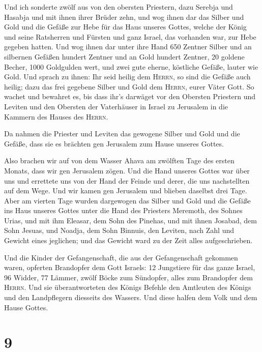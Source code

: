  Und ich sonderte zwölf aus von den obersten Priestern,
dazu Serebja und Hasabja und mit ihnen ihrer Brüder zehn,
 und wog ihnen dar das Silber und Gold und die Gefäße zur
Hebe für das Haus unseres Gottes, welche der König und seine Ratsherren
und Fürsten und ganz Israel, das vorhanden war, zur Hebe gegeben hatten.
 Und wog ihnen dar unter ihre Hand 650 Zentner Silber und
an silbernen Gefäßen hundert Zentner und an Gold hundert Zentner,
 20 goldene Becher, 1000 Goldgulden wert, und zwei gute
eherne, köstliche Gefäße, lauter wie Gold.  Und sprach zu
ihnen: Ihr seid heilig dem \textsc{Herrn}, so sind die Gefäße auch
heilig; dazu das frei gegebene Silber und Gold dem \textsc{Herrn}, eurer
Väter Gott.  So wachet und bewahret es, bis dass ihr's
darwäget vor den Obersten Priestern und Leviten und den Obersten der
Vaterhäuser in Israel zu Jerusalem in die Kammern des Hauses des
\textsc{Herrn}.

 Da nahmen die Priester und Leviten das gewogene Silber
und Gold und die Gefäße, dass sie es brächten gen Jerusalem zum Hause
unseres Gottes.

 Also brachen wir auf von dem Wasser Ahava am zwölften
Tage des ersten Monats, dass wir gen Jerusalem zögen. Und die Hand
unseres Gottes war über uns und errettete uns von der Hand der Feinde
und derer, die uns nachstellten auf dem Wege.  Und wir
kamen gen Jerusalem und blieben daselbst drei Tage.  Aber
am vierten Tage wurden dargewogen das Silber und Gold und die Gefäße ins
Haus unseres Gottes unter die Hand des Priesters Meremoth, des Sohnes
Urias, und mit ihm Eleasar, dem Sohn des Pinehas, und mit ihnen Josabad,
dem Sohn Jesuas, und Noadja, dem Sohn Binnuis, den Leviten,
 nach Zahl und Gewicht eines jeglichen; und das Gewicht
ward zu der Zeit alles aufgeschrieben.

 Und die Kinder der Gefangenschaft, die aus der
Gefangenschaft gekommen waren, opferten Brandopfer dem Gott Israels: 12
Jungstiere für das ganze Israel, 96 Widder, 77 Lämmer, zwölf Böcke zum
Sündopfer, alles zum Brandopfer dem \textsc{Herrn}.  Und
sie überantworteten des Königs Befehle den Amtleuten des Königs und den
Landpflegern diesseits des Wassers. Und diese halfen dem Volk und dem
Hause Gottes.

\hypertarget{section-8}{%
\section{9}\label{section-8}}

